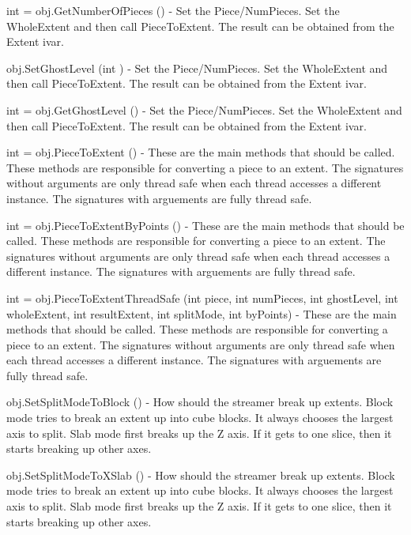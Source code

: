 \begin{DoxyItemize}
\item {\ttfamily int = obj.\-Get\-Number\-Of\-Pieces ()} -\/ Set the Piece/\-Num\-Pieces. Set the Whole\-Extent and then call Piece\-To\-Extent. The result can be obtained from the Extent ivar.  
\item {\ttfamily obj.\-Set\-Ghost\-Level (int )} -\/ Set the Piece/\-Num\-Pieces. Set the Whole\-Extent and then call Piece\-To\-Extent. The result can be obtained from the Extent ivar.  
\item {\ttfamily int = obj.\-Get\-Ghost\-Level ()} -\/ Set the Piece/\-Num\-Pieces. Set the Whole\-Extent and then call Piece\-To\-Extent. The result can be obtained from the Extent ivar.  
\item {\ttfamily int = obj.\-Piece\-To\-Extent ()} -\/ These are the main methods that should be called. These methods are responsible for converting a piece to an extent. The signatures without arguments are only thread safe when each thread accesses a different instance. The signatures with arguements are fully thread safe.  
\item {\ttfamily int = obj.\-Piece\-To\-Extent\-By\-Points ()} -\/ These are the main methods that should be called. These methods are responsible for converting a piece to an extent. The signatures without arguments are only thread safe when each thread accesses a different instance. The signatures with arguements are fully thread safe.  
\item {\ttfamily int = obj.\-Piece\-To\-Extent\-Thread\-Safe (int piece, int num\-Pieces, int ghost\-Level, int whole\-Extent, int result\-Extent, int split\-Mode, int by\-Points)} -\/ These are the main methods that should be called. These methods are responsible for converting a piece to an extent. The signatures without arguments are only thread safe when each thread accesses a different instance. The signatures with arguements are fully thread safe.  
\item {\ttfamily obj.\-Set\-Split\-Mode\-To\-Block ()} -\/ How should the streamer break up extents. Block mode tries to break an extent up into cube blocks. It always chooses the largest axis to split. Slab mode first breaks up the Z axis. If it gets to one slice, then it starts breaking up other axes.  
\item {\ttfamily obj.\-Set\-Split\-Mode\-To\-X\-Slab ()} -\/ How should the streamer break up extents. Block mode tries to break an extent up into cube blocks. It always chooses the largest axis to split. Slab mode first breaks up the Z axis. If it gets to one slice, then it starts breaking up other axes.  

\end{DoxyItemize}
